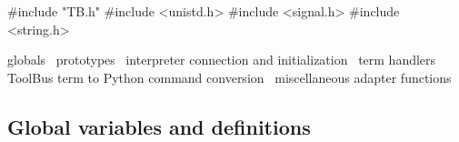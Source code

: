 #include "TB.h"
#include <unistd.h>
#include <signal.h>
#include <string.h>

\LA{}globals~{\nwtagstyle{}}\RA{}
\LA{}prototypes~{\nwtagstyle{}}\RA{}
\LA{}interpreter connection and initialization~{\nwtagstyle{}}\RA{}
\LA{}term handlers~{\nwtagstyle{}}\RA{}
\LA{}ToolBus term to Python command conversion~{\nwtagstyle{}}\RA{}
\LA{}miscellaneous adapter functions~{\nwtagstyle{}}\RA{}
\nwendcode{}\nwdocspar

\subsection{Global variables and definitions}

